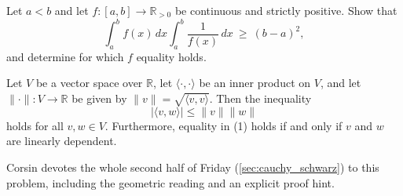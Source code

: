 \begin{exercise}
\label{ex:integral_reciprocal_inequality}
Let $a < b$ and let $f : [a,b] \to \mathbb{R}_{>0}$ be continuous and strictly positive. Show
that
\[\int_a^b f(x)\,dx \int_a^b \frac{1}{f(x)}\,dx \ \geq\ (b-a)^2 ,\]
and determine for which $f$ equality holds.
\end{exercise}




\begin{exercise}
\label{ex:cauchy_schwarz_statement}
Let $V$ be a vector space over $\mathbb{R}$, let $\langle\cdot,\cdot\rangle$ be an inner product
on $V$, and let $\|\cdot\| : V \to \mathbb{R}$ be given by $\|v\| = \sqrt{\langle v,v\rangle}$.
Then the inequality
\begin{equation*}
|\langle v,w\rangle| \leq \|v\|\|w\| \tag{1}
\end{equation*}
holds for all $v, w \in V$. Furthermore, equality in (1) holds if and only if $v$ and $w$ are
linearly dependent.
\end{exercise}

\begin{remark}
Corsin devotes the whole second half of Friday (\cref{sec:cauchy_schwarz}) to this problem,
including the geometric reading and an explicit proof hint.
\end{remark}

